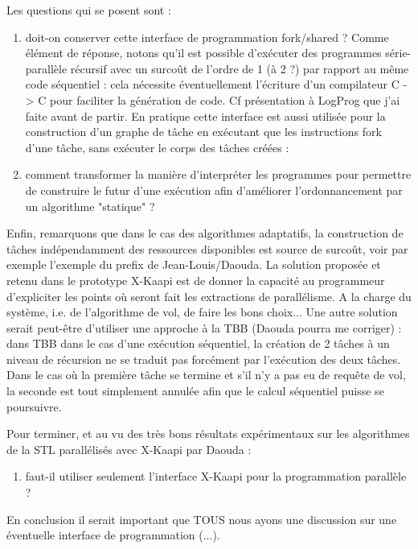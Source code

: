 \documentclass{report}
\begin{document}
Les questions qui se posent sont :
\begin{enumerate}[label=\textbf{Q \theenumi.},ref=\textbf{Q \theenumi},start=1]
	\item doit-on conserver cette interface de programmation fork/shared ? 
Comme élément de réponse, notons qu'il est possible d'exécuter des programmes série-parallèle récursif avec un surcoût de l'ordre de 1 (à 2 ?)  par rapport au même code séquentiel : cela nécessite éventuellement l'écriture d'un compilateur C -> C pour faciliter la génération de code. Cf présentation à LogProg que j'ai faite avant de partir.
En pratique cette interface est aussi utilisée pour la construction d'un graphe de tâche en exécutant que les instructions fork d'une tâche, sans exécuter le corps des tâches créées : 
	\item comment transformer la manière d'interpréter les programmes pour permettre de construire le futur d'une exécution afin d'améliorer l'ordonnancement par un algorithme "statique" ?
\end{enumerate}

	Enfin, remarquons que dans le cas des algorithmes adaptatifs, la construction de tâches indépendamment des ressources disponibles est source de surcoût, voir par exemple l'exemple du prefix de Jean-Louis/Daouda. La solution proposée et retenu dans le prototype X-Kaapi est de donner la capacité au programmeur d'expliciter les points où seront fait les extractions de parallélisme. A la charge du système, i.e. de l'algorithme de vol, de faire les bons choix...
	Une autre solution serait peut-être d'utiliser une approche à la TBB (Daouda pourra me corriger) : dans TBB dans le cas d'une exécution séquentiel, la création de 2 tâches à un niveau de récursion ne se traduit pas forcément par l'exécution des deux tâches. Dans le cas où la première tâche se termine et s'il n'y a pas eu de requête de vol, la seconde est tout simplement annulée afin que le calcul séquentiel puisse se poursuivre.

Pour terminer, et au vu des très bons résultats expérimentaux sur les algorithmes de la STL parallélisés avec X-Kaapi par Daouda :
\begin{enumerate}[label=\textbf{Q \theenumi.},ref=\textbf{Q \theenumi},resume]
	\item  faut-il utiliser seulement l'interface X-Kaapi pour la programmation parallèle ?
\end{enumerate}

En conclusion il serait important que TOUS nous ayons une discussion sur une éventuelle interface de programmation (...). 
\end{document}
